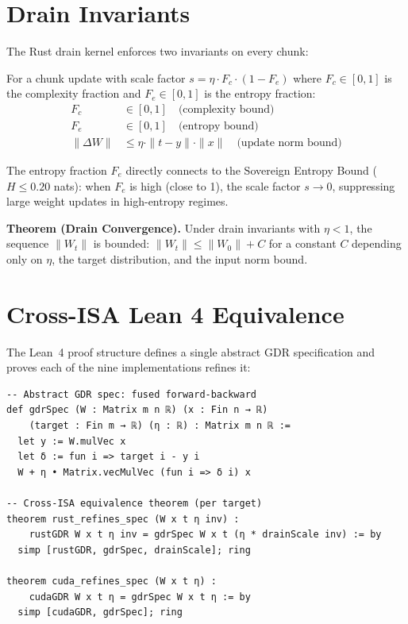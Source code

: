 \documentclass[10pt,conference]{IEEEtran}
\begin{document}
\section{Drain Invariants}
\label{sec:drain}

The Rust drain kernel enforces two invariants on every chunk:

\begin{definition}
For a chunk update with scale factor $s = \eta \cdot F_c \cdot (1 - F_e)$
where $F_c \in [0,1]$ is the complexity fraction and $F_e \in [0,1]$ is the
entropy fraction:
\begin{align}
  F_c &\in [0, 1] \quad \text{(complexity bound)} \\
  F_e &\in [0, 1] \quad \text{(entropy bound)} \\
  \|{\Delta W}\| &\leq \eta \cdot \|t - y\| \cdot \|x\|
                  \quad \text{(update norm bound)}
\end{align}
\end{definition}

The entropy fraction $F_e$ directly connects to the Sovereign Entropy Bound
($H \leq 0.20$ nats): when $F_e$ is high (close to 1), the scale factor
$s \to 0$, suppressing large weight updates in high-entropy regimes.

\textbf{Theorem (Drain Convergence).} Under drain invariants with $\eta < 1$,
the sequence $\|W_t\|$ is bounded: $\|W_t\| \leq \|W_0\| + C$ for a constant
$C$ depending only on $\eta$, the target distribution, and the input norm bound.


\section{Cross-ISA Lean 4 Equivalence}
\label{sec:lean4}

The Lean~4 proof structure defines a single abstract GDR specification and
proves each of the nine implementations refines it:

\begin{lstlisting}[style=lean4,caption={Lean 4 GDR specification (excerpt)}]
-- Abstract GDR spec: fused forward-backward
def gdrSpec (W : Matrix m n ℝ) (x : Fin n → ℝ)
    (target : Fin m → ℝ) (η : ℝ) : Matrix m n ℝ :=
  let y := W.mulVec x
  let δ := fun i => target i - y i
  W + η • Matrix.vecMulVec (fun i => δ i) x

-- Cross-ISA equivalence theorem (per target)
theorem rust_refines_spec (W x t η inv) :
    rustGDR W x t η inv = gdrSpec W x t (η * drainScale inv) := by
  simp [rustGDR, gdrSpec, drainScale]; ring

theorem cuda_refines_spec (W x t η) :
    cudaGDR W x t η = gdrSpec W x t η := by
  simp [cudaGDR, gdrSpec]; ring
\end{lstlisting}
\end{document}
